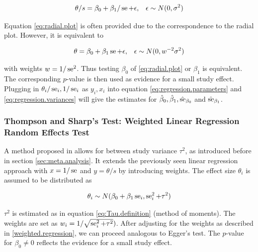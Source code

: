 \documentclass[11pt,a4paper,twoside]{book}\usepackage[]{graphicx}\usepackage[]{color}
\begin{document}
\begin{align}
\theta/s &= \beta_0 + \beta_1/\operatorname{se} + \epsilon, & \epsilon \sim N(0, \sigma^2) \label{eq:radial.plot} 
\end{align}

Equation \eqref{eq:radial.plot} is often provided due to the correspondence to the radial plot. However, it is equivalent to

\begin{align}
\theta &= \beta_0 + \beta_1 \operatorname{se} + \epsilon, & \epsilon \sim N(0, w^{-2}\sigma^2) \label{eq:egger.plot}
\end{align}

with weights $w = 1/\operatorname{se}^2$. Thus testing $\beta_0$ of \eqref{eq:radial.plot} or $\beta_1$ is equivalent. The corresponding $p$-value is then used as evidence for a small study effect. Plugging in  $\theta_i/\operatorname{se}_i, 1/\operatorname{se}_i$ as $y_i, x_i$ into equation \eqref{eq:regression.parameters} and \eqref{eq:regression.variances} will give the estimates for $\hat{\beta}_0, \hat{\beta}_1,\hat{\operatorname{se}}_{\beta_0}$ and $\hat{\operatorname{se}}_{\beta_1}$.



\subsubsection{Thompson and Sharp's Test: Weighted Linear Regression Random Effects Test} \label{sec:Thompson}
A method proposed in \citet{thompson.sharp} allows for between study variance $\tau^2$, as introduced before in section \ref{sec:meta.analysis}. It extends the previously seen linear regression approach with $x = 1/\operatorname{se}$ and $y = \theta/s$ by introducing weights. The effect size $\theta_i$ is assumed to be distributed as

\begin{align}
\theta_i \sim N(\beta_0 + \beta_1 \operatorname{se}_i, \operatorname{se}_i^2 + \tau^2) \label{t.sharp.regression}
\end{align}

$\tau^2$ is estimated as in equation \eqref{eq:Tau.definition} (method of moments). %
The weights are set as $w_i = 1/\sqrt{\operatorname{se}_i^2 + \tau^2})$. After adjusting for the weights as described in \ref{weighted.regression}, we can proceed analogous to Egger's test. The $p$-value for $\beta_{0} \neq 0$ reflects the evidence for a small study effect.
\end{document}

